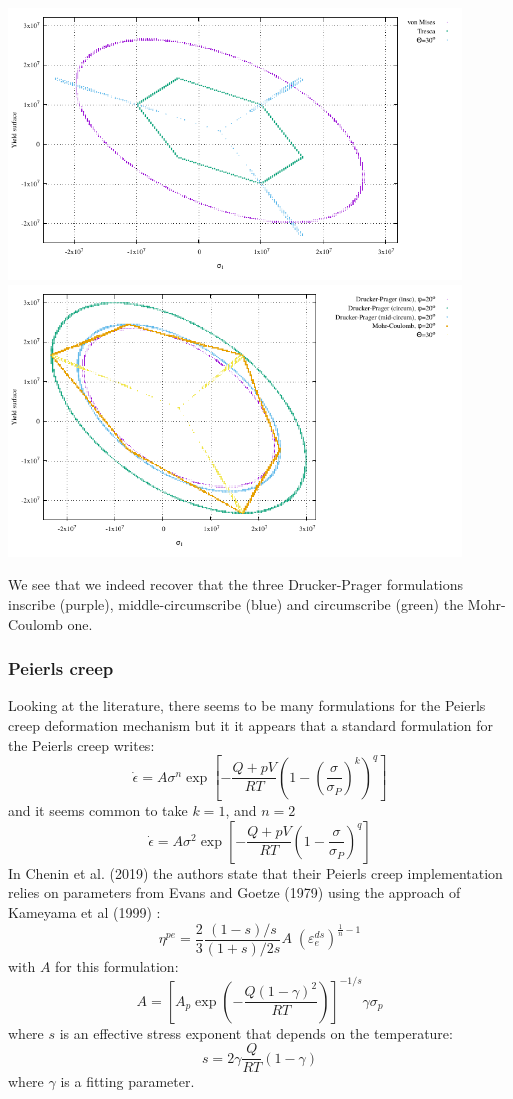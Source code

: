 \begin{center}
\includegraphics[width=12cm]{images/rheology/surfaces/surfaces_plane2.pdf}
\includegraphics[width=12cm]{images/rheology/surfaces/surfaces_plane.pdf}
\end{center}

We see that we indeed recover that the three Drucker-Prager formulations 
inscribe (purple), middle-circumscribe (blue) and circumscribe (green) the 
Mohr-Coulomb one. 



\newpage
\subsubsection{Peierls creep}

Looking at the literature, there seems to be many formulations for the Peierls creep deformation
mechanism but it it appears that a standard formulation for the Peierls creep writes:
\[
\dot{\epsilon} = A \sigma^n \exp \left[ -\frac{Q+pV}{RT} \left(1-(\frac{\sigma}{\sigma_P})^k\right)^q  \right]
\]
and it seems common to take $k=1$, and $n=2$ \cite{gery10,kaka08}
\[
\dot{\epsilon} = A \sigma^2 \exp \left[ -\frac{Q+pV}{RT} \left(1-\frac{\sigma}{\sigma_P}\right)^q  \right]
\]
In Chenin et al. (2019) \cite{chmd19} the authors state that their Peierls creep implementation
relies on parameters from Evans and Goetze (1979) \cite{evgo79} using the approach of 
Kameyama et al (1999) \cite{kayk99}:
\[
\eta^{pe}=\frac{2}{3} \frac{(1-s)/s}{(1+s)/2s} A \; (\varepsilon_e^{ds})^{\frac{1}{n}-1} 
\]
with $A$ for this formulation:
\[
A = \left[ A_p \exp \left( -\frac{Q(1-\gamma)^2}{RT} \right)  \right]^{-1/s} \gamma \sigma_p
\]
where $s$ is an effective stress exponent that depends on the temperature:
\[
s = 2 \gamma \frac{Q}{RT} (1-\gamma)
\]
where $\gamma$ is a fitting parameter. 


